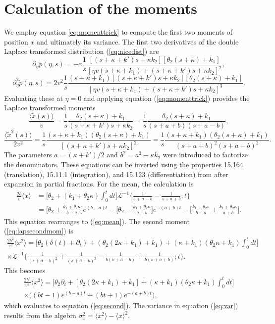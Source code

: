 \documentclass[]{agujournal2018}
\newcommand\be{\begin{equation}}
\newcommand\ee{\end{equation}}
\newcommand\bra{\langle}
\newcommand\ket{\rangle}
\newcommand\tp{\tilde{p}}
\newcommand\El{\mathcal{L}}
\begin{document}
\section{Calculation of the moments}
\label{sec:appendixB}
We employ equation \ref{eq:momenttrick} to compute the first two moments of position $x$ and ultimately its variance. The first two derivatives of the double Laplace transformed distribution (\ref{eq:nicedist}) are
\be \partial_\eta \tp(\eta,s) = -v \frac{1}{s}\frac{[(s+\kappa + k')s + \kappa k_2][\theta_2(s+\kappa) + k_1]}{[\eta v(s+\kappa +k_1) + (s+ \kappa + k')s+\kappa k_2]^2},\ee
\be \partial_\eta^2 \tp(\eta,s) = 2v^2 \frac{1}{s} \frac{(s+\kappa+k_1)[(s+\kappa + k')s+\kappa k_2][\theta_2(s+\kappa) + k_1]}{[\eta v(s+\kappa + k_1) + (s+\kappa + k')s+ \kappa k_2]^3}.\ee
Evaluating these at $\eta=0$ and applying equation (\ref{eq:momenttrick}) provides the Laplace transformed moments
\be  \frac{\bra\tilde{x}(s)\ket} {v} = \frac{1}{s}\frac{\theta_2(s+\kappa)+k_1}{(s+\kappa+k')s+\kappa k_2} = \frac{1}{s} \frac{\theta_2(s+\kappa)+k_1}{(s+a+b)(s+a-b)}\label{eq:lapmean},\ee
\be \frac{\bra \tilde{x}^2(s) \ket}{2v^2} = \frac{1}{s} \frac{(s+\kappa+k_1)(\theta_2(s+\kappa)+k_1)}{[(s+\kappa+k')s+\kappa k_2]^2}=  \frac{1}{s}\frac{(s+\kappa+k_1)(\theta_2(s+\kappa)+k_1)}{(s+a+b)^2(s+a-b)^2}.\label{eq:lapsecondmom}\ee
The parameters $a= (\kappa+k')/2$ and $b^2 = a^2 -\kappa k_2$ were introduced to factorize the denominators.
These equations can be inverted using the properties 15.164 (translation), 15.11.1 (integration), and 15.123 (differentiation) from  \citet{Arfken1985} after expansion in partial fractions.
For the mean, the calculation is
\begin{align}
\frac{2b}{v}\bra x \ket &= \big[\theta_2 + (k_1+\theta_2 \kappa)\int_0^t dt\big]\El^{-1}\Big\{ \frac{1}{s+a-b}-\frac{1}{s+a+b};t\Big\}\\
&= \Big[\theta_2 + \frac{k_1+\theta_2\kappa}{b-a}\Big]e^{(b-a)t} - \Big[\theta_2 - \frac{k_1+\theta_2\kappa}{a+b}\Big]e^{-(a+b)t} - \Big[\frac{k_1+\theta_2\kappa}{b-a} + \frac{k_1+\theta_2\kappa}{a+b}\Big].
\end{align}
This equation rearranges to (\ref{eq:mean}).
The second moment (\ref{eq:lapsecondmom}) is 
\begin{multline}
\frac{2b^2}{v^2}\bra x^2 \ket = \Big[\theta_2(\delta(t) + \partial_t) + (\theta_2(2\kappa + k_1)+k_1) + (\kappa+k_1)(\theta_2\kappa+k_1)\int_0^t dt \Big] \\
\times \El^{-1}\Big\{ \frac{1}{(s+a-b)^2} + \frac{1}{(s+a+b)^2}-\frac{1}{b(s+a-b)}+\frac{1}{b(s+a+b)};t\Big\}.
\end{multline}
This becomes 
\begin{multline}
\frac{2b^3}{v^2}\bra x^2 \ket = \Big[\theta_2\partial_t + [\theta_2(2\kappa+k_1)+k_1] + (\kappa+k_1)(\theta_2\kappa+k_1)\int_0^tdt\Big]\\
\times \Big((bt-1)e^{(b-a)t}+(bt+1)e^{-(a+b)t}\Big),
\end{multline}
which evaluates to equation (\ref{eq:second}).
The variance in equation (\ref{eq:var}) results from the algebra $\sigma_x^2 = \bra x^2 \ket - \bra x \ket^2.$
\end{document}
